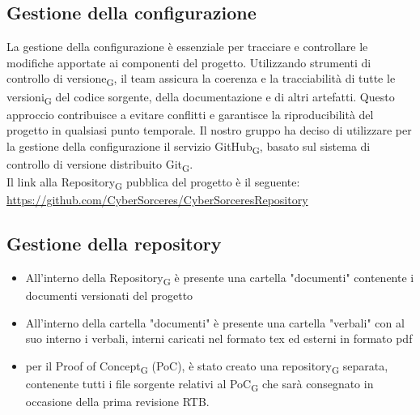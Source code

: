 \documentclass{article}
\begin{document}
\subsection{Gestione della configurazione}
La gestione della configurazione è essenziale per tracciare e controllare le modifiche apportate ai componenti del progetto. Utilizzando strumenti di controllo di versione\textsubscript{G}, il team assicura la coerenza e la tracciabilità di tutte le versioni\textsubscript{G} del codice sorgente, della documentazione e di altri artefatti. Questo approccio contribuisce a evitare conflitti e garantisce la riproducibilità del progetto in qualsiasi punto temporale. Il nostro gruppo ha deciso di utilizzare per la gestione della configurazione il servizio GitHub\textsubscript{G}, basato sul sistema di controllo di versione distribuito Git\textsubscript{G}. \\ Il link alla Repository\textsubscript{G} pubblica del progetto è il seguente: \\ \href{https://github.com/CyberSorceres/CyberSorceresRepository}{https://github.com/CyberSorceres/CyberSorceresRepository}
\subsection*{Gestione della repository}
\begin{itemize}
    \item All'interno della Repository\textsubscript{G} è presente una cartella "documenti" contenente i documenti versionati del progetto
    \item All'interno della cartella "documenti" è presente una cartella "verbali" con al suo interno i verbali, interni caricati nel formato tex ed esterni in formato pdf
    \item per il Proof of Concept\textsubscript{G} (PoC), è stato creato una repository\textsubscript{G} separata, contenente tutti i file sorgente relativi al PoC\textsubscript{G} che sarà consegnato in occasione della prima revisione RTB.
\end{itemize}
\end{document}
